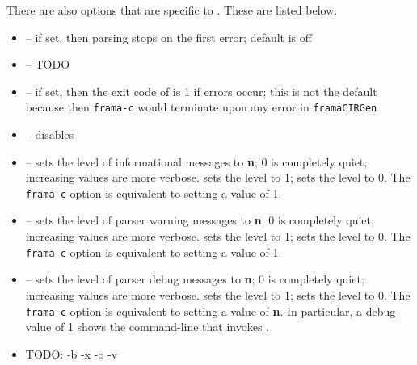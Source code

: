 There are also options that are specific to \fcl.
These are listed below:
\begin{itemize}
	\item {} -- if set, then parsing stops on the first error; default is off
	\item {} -- TODO
	\item {} -- if set, then the exit code of \irg is 1 if errors occur; this is not the default because then \lstinline|frama-c| would terminate upon
	any error in \lstinline|framaCIRGen|
	\item {} -- disables 
	\item {} -- sets the level of informational messages to \textbf{n}; 0 is completely quiet; increasing values are
	more verbose.  sets the level to 1; 
	 sets the level to 0. The \lstinline|frama-c| option  is equivalent to setting a value of 1.
	\item {} -- sets the level of parser warning messages to \textbf{n}; 0 is completely quiet; increasing values are
more verbose.  sets the level to 1; 
 sets the level to 0. The \lstinline|frama-c| option  is equivalent to setting a value of 1.

	\item {} -- sets the level of parser debug messages to \textbf{n}; 0 is completely quiet; increasing values are
more verbose.  sets the level to 1; 
 sets the level to 0. The \lstinline|frama-c| option  is equivalent to setting a value of \textbf{n}.
In particular, a debug value of 1 shows the command-line that invokes
\irg.
\item TODO: -b -x -o -v
	
\end{itemize}


